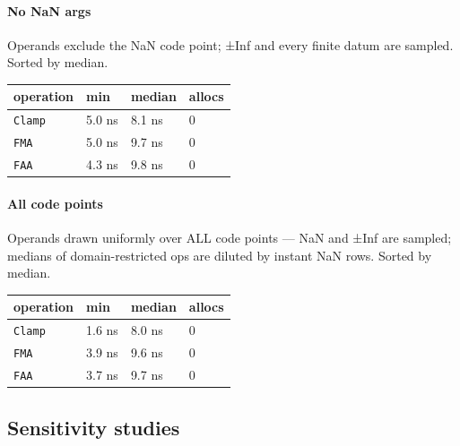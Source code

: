 \paragraph{No NaN args}\indent



\label{14279209625200149733}{}


Operands exclude the NaN code point; ±Inf and every finite datum are sampled. Sorted by median.




\begin{table}[h]
\centering
\nopagebreak[3]
\begin{tabulary}{\linewidth}{L L L L}
\toprule
operation & min & median & allocs \\
\toprule
\texttt{Clamp} & 5.0 ns & 8.1 ns & 0 \\
\texttt{FMA} & 5.0 ns & 9.7 ns & 0 \\
\texttt{FAA} & 4.3 ns & 9.8 ns & 0 \\
\bottomrule
\end{tabulary}

\end{table}



\paragraph{All code points}\indent



\label{689699942421014554}{}


Operands drawn uniformly over ALL code points — NaN and ±Inf are sampled; medians of domain-restricted ops are diluted by instant NaN rows. Sorted by median.




\begin{table}[h]
\centering
\nopagebreak[3]
\begin{tabulary}{\linewidth}{L L L L}
\toprule
operation & min & median & allocs \\
\toprule
\texttt{Clamp} & 1.6 ns & 8.0 ns & 0 \\
\texttt{FMA} & 3.9 ns & 9.6 ns & 0 \\
\texttt{FAA} & 3.7 ns & 9.7 ns & 0 \\
\bottomrule
\end{tabulary}

\end{table}



\subsection{Sensitivity studies}




